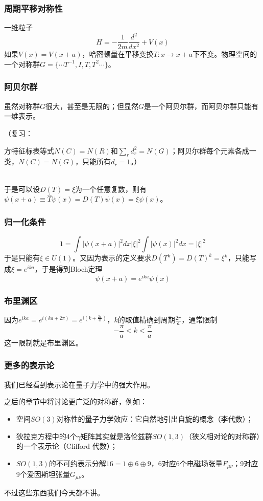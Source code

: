 \documentclass[CJK]{beamer}
\begin{document}
\begin{frame}
\frametitle{\bch 周期平移对称性\ech}
\bch
一维粒子
$$
H = -\frac{1}{2m} \frac{d^2}{dx^2} + V(x)
$$
如果$V(x) = V(x+a)$，哈密顿量在平移变换$T : x \to x+a$下不变。物理空间的一个对称群$G = \{ \cdots T^{-1} , I, T , T^2 \cdots\}$。
\ech
\end{frame}


\begin{frame}
\frametitle{\bch 阿贝尔群\ech}
\bch
虽然对称群$G$很大，甚至是无限的；但显然$G$是一个阿贝尔群，而阿贝尔群只能有一维表示。
\par
（复习：
\par
方特征标表等式$N(C) = N(R)$和$\sum_r d_r^2 = N(G)$；阿贝尔群每个元素各成一类，$N(C) = N(G)$，只能所有$d_r = 1$。）
\\  \ \\
\par
于是可以设$D(T) = \xi$为一个任意复数，则有$\psi(x+a) \equiv \hat T \psi(x) = D(T) \psi(x) = \xi \psi(x)$。
\ech
\end{frame}

\begin{frame}
\frametitle{\bch 归一化条件 \ech}
\bch
$$1 = \int |\psi(x+a) |^2 dx  |\xi|^2 \int |\psi(x)|^2 dx = |\xi|^2$$
于是只能有$\xi \in U(1)$。又因为表示的定义要求$D(T^k) = D(T)^k = \xi^k$，只能写成$\xi = e^{ika}$，于是得到Bloch定理
$$
\psi(x+a) = e^{ika} \psi(x)
$$
\ech
\end{frame}

\begin{frame}
\frametitle{\bch 布里渊区 \ech}
\bch
因为$e^{ika} = e^{i(ka + 2\pi)} = e^{i(k + \frac{2\pi}{a} )}$，$k$的取值精确到周期$\frac{2\pi}{a}$，通常限制$$-\frac{\pi}{a} < k < \frac{\pi}{a}$$
这一限制就是布里渊区。
\ech
\end{frame}

\begin{frame}
\frametitle{\bch 更多的表示论 \ech}
\bch
我们已经看到表示论在量子力学中的强大作用。
\par
之后的章节中将讨论更广泛的对称群，例如：
\begin{itemize}
\item 空间$SO(3)$对称性的量子力学效应：它自然地引出自旋的概念（李代数）；
\item 狄拉克方程中的4个$\gamma$矩阵其实就是洛伦兹群$SO(1,3)$（狭义相对论的对称群）的一个表示论（Clifford 代数）；
\item $SO(1,3)$的不可约表示分解$16 = 1 \oplus 6 \oplus 9$，6对应6个电磁场张量$F_{\mu \nu}$；9对应9个爱因斯坦张量$G_{\mu \nu}$。
\end{itemize}
\par
不过这些东西我们今天都不讲。
\ech
\end{frame}
\end{document}
